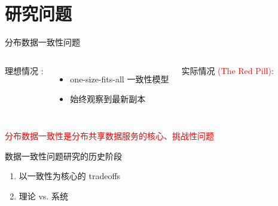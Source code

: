 \section{研究问题}

\begin{frame}{分布数据一致性问题}
  \begin{columns}[t]
	  理想情况 :
	  \begin{itemize}
		\item one-size-fits-all 一致性模型
		\item 始终观察到最新副本
	  \end{itemize}
    \pause
	  实际情况 \textcolor{red}{\scriptsize (The Red Pill)}:
  \end{columns}
  \pause
  \begin{center}
	\textcolor{red}{分布数据一致性是分布共享数据服务的核心、挑战性问题}
  \end{center}
\end{frame}
%       
\begin{frame}{数据一致性问题研究的历史阶段}

  \vspace{0.20cm}

  \begin{center}
	\begin{enumerate}
	  \centering
	  \item 以一致性为核心的 tradeoffs
	  \item 理论 vs. 系统
	\end{enumerate}
  \end{center}
\end{frame}
